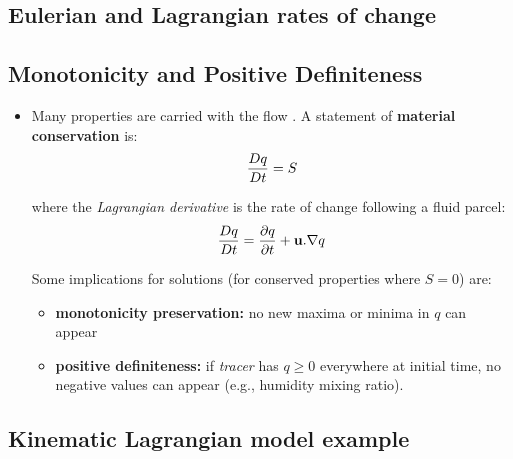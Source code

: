 \subsection{Eulerian and Lagrangian rates of change}
\subsection{Monotonicity and Positive Definiteness}

	\begin{itemize}
		\item
		Many properties are carried with the flow . A statement of {\bf
			material conservation} is:
		\begin{equation}
		\frac{D q}{D t}=S
		\label{lagdef}
		\end{equation}
		
		where the {\em Lagrangian derivative} is the rate of change following a fluid parcel:
		\begin{equation}
		\frac{D q}{D t}=\frac{\partial q}{\partial t}+{\bf u}.\nabla q
		\end{equation}
		
		Some implications for solutions (for conserved properties where $S=0$) are:
		
				
				\begin{itemize}
					\item
					{\bf monotonicity preservation:} no new maxima or minima in $q$ can appear
					
					\item
					{\bf positive definiteness:} if {\em tracer} has $q\ge 0$ everywhere at
					initial time, no negative values can appear (e.g., humidity mixing
					ratio).
				\end{itemize}
				
		
	\end{itemize}

\subsection{Kinematic Lagrangian model example} 

